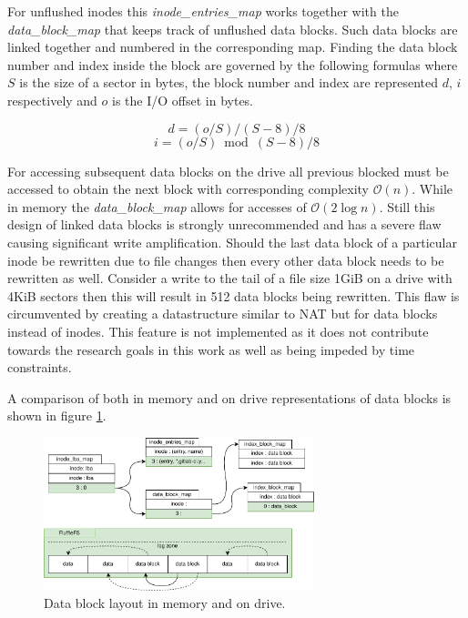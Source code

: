 For unflushed inodes this \textit{inode\_entries\_map} works together with the
\textit{data\_block\_map} that keeps track of unflushed data blocks. Such data
blocks are linked together and numbered in the corresponding map. Finding the
data block number and index inside the block are governed by the following
formulas where $S$ is the size of a sector in bytes, the block number and index
are represented $d$, $i$ respectively and $o$ is the I/O offset in bytes.

$$d = (o / S) / (S - 8) /8$$
$$i = (o / S) \bmod{(S - 8) /8}$$

For accessing subsequent data blocks on the drive all previous blocked must be
accessed to obtain the next block with corresponding complexity
$\mathcal{O}(n)$. While in memory the \textit{data\_block\_map} allows for
accesses of $\mathcal{O}(2 \log n)$. Still this design of linked data blocks is
strongly unrecommended and has a severe flaw causing significant write
amplification. Should the last data block of a particular inode be rewritten due
to file changes then every other data block needs to be rewritten as well.
Consider a write to the tail of a file size 1GiB on a drive with 4KiB sectors
then this will result in 512 data blocks being rewritten. This flaw is
circumvented by creating a datastructure similar to NAT but for data blocks
instead of inodes. This feature is not implemented as it does not contribute
towards the research goals in this work as well as being impeded by time
constraints.

A comparison of both in memory and on drive representations of data blocks
is shown in figure \ref{figure:fluffledatablock}.

\begin{figure}[h!]
    \centering
	\includegraphics[width=0.7\textwidth]{resources/images/fluffle-data-block.pdf}
	\caption{Data block layout in memory and on drive.}
    \label{figure:fluffledatablock}
\end{figure}

